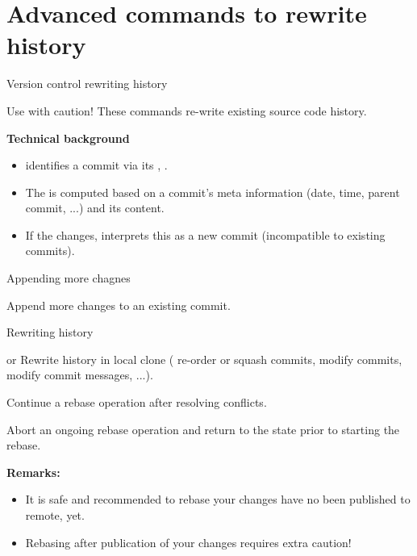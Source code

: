 \section{Advanced  commands to rewrite history}

\begin{frame}{Version control {\vs} rewriting history}
\begin{alertblock}{Use with caution!}
These commands re-write existing source code history.
\end{alertblock}

\textbf{Technical background}
\begin{itemize}
\item {} identifies a commit via its , {\eg} .
\item The  is computed based on a commit's meta information (date, time, parent commit, ...) and its content.
\item If the  changes,  interprets this as a new commit (incompatible to existing commits). 
\end{itemize}
\end{frame}

\begin{frame}{Appending more chagnes}
\begin{block}{}
Append more changes to an existing commit.
\end{block}
\end{frame}

\begin{frame}{Rewriting history}
\begin{block}{ or }
Rewrite history in local clone ({\eg} re-order or squash commits, modify commits, modify commit messages, ...).
\end{block}
\begin{block}{}
Continue a rebase operation after resolving conflicts.
\end{block}
\begin{block}{}
Abort an ongoing rebase operation and return to the state prior to starting the rebase.
\end{block}
\textbf{Remarks:}
\begin{itemize}
\item It is safe and recommended to rebase  your changes have no been published to remote, yet.
\item Rebasing after publication of your changes requires extra caution!
\end{itemize}

\end{frame}

